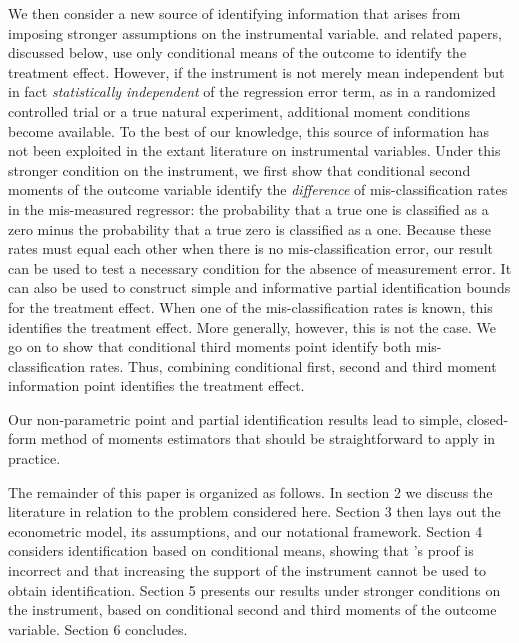 We then consider a new source of identifying information that arises from imposing stronger assumptions on the instrumental variable.
\cite{Mahajan} and related papers, discussed below, use only conditional means of the outcome to identify the treatment effect.
However, if the instrument is not merely mean independent but in fact \emph{statistically independent} of the regression error term, as in a randomized controlled trial or a true natural experiment, additional moment conditions become available.
To the best of our knowledge, this source of information has not been exploited in the extant literature on instrumental variables.  
Under this stronger condition on the instrument, we first show that conditional second moments of the outcome variable identify the \emph{difference} of mis-classification rates in the mis-measured regressor: the probability that a true one is classified as a zero minus the probability that a true zero is classified as a one.
Because these rates must equal each other when there is no mis-classification error, our result can be used to test a necessary condition for the absence of measurement error.   
It can also be used to construct simple and informative partial identification bounds for the treatment effect.
When one of the mis-classification rates is known, this identifies the treatment effect.
More generally, however, this is not the case.
We go on to show that conditional third moments point identify both mis-classification rates.
Thus, combining conditional first, second and third moment information point identifies the treatment effect.

Our non-parametric point and partial identification results lead to simple, closed-form method of moments estimators that should be straightforward to apply in practice.

The remainder of this paper is organized as follows. 
In section 2 we discuss the literature in relation to the problem considered here. 
Section 3 then lays out the econometric model, its assumptions, and our notational framework. 
Section 4 considers identification based on conditional means, showing that \citeauthor{Mahajan}'s proof is incorrect and that increasing the support of the instrument cannot be used to obtain identification.
Section 5 presents our results under stronger conditions on the instrument, based on conditional second and third moments of the outcome variable.
Section 6 concludes.  

